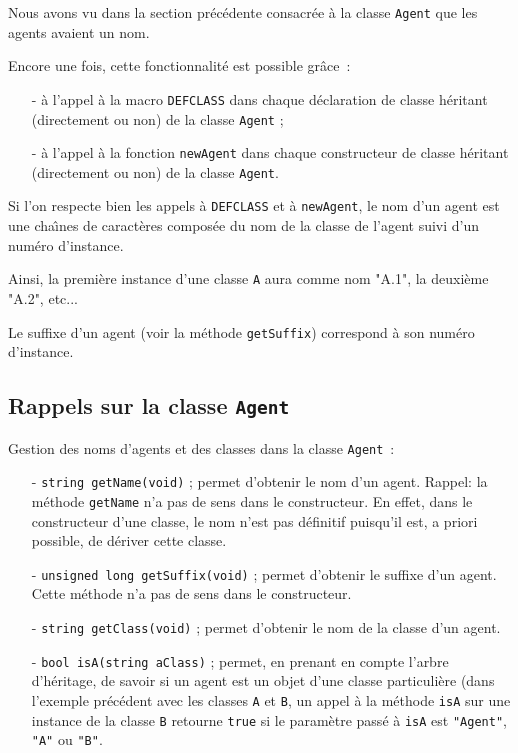 \documentclass[12pt]{article}
\begin{document}
Nous avons vu dans la section pr\'ec\'edente consacr\'ee \`a la
classe {\tt Agent} que les agents avaient un nom.

Encore une fois, cette fonctionnalit\'e est possible gr\^ace~:
\begin{itemize}
\item[-] \`a l'appel \`a la macro {\tt DEFCLASS} dans chaque d\'eclaration
de classe h\'eritant (directement ou non) de la classe {\tt Agent} ;
\item[-] \`a l'appel \`a la fonction {\tt newAgent} dans chaque
constructeur de classe h\'eritant (directement ou non) de la classe
{\tt Agent}.
\end{itemize}

Si l'on respecte bien les appels \`a {\tt DEFCLASS} et \`a {\tt newAgent},
le nom d'un agent est une cha\^ \i nes de caract\`eres compos\'ee
du nom de la classe de l'agent suivi d'un num\'ero d'instance.

Ainsi, la premi\`ere instance d'une classe {\tt A} aura comme nom "A.1",
la deuxi\`eme "A.2", etc...

Le suffixe d'un agent (voir la m\'ethode {\tt getSuffix})
correspond \`a son num\'ero d'instance.

\subsection{Rappels sur la classe {\tt Agent}}

Gestion des noms d'agents et des classes dans la classe {\tt Agent}~:

\begin{itemize}
\vspace{-0.2cm}
\item[-] {\tt string getName(void)} ; permet d'obtenir le nom d'un agent.
Rappel: la m\'ethode {\tt getName} n'a pas de sens dans le constructeur. 
En effet, dans le constructeur d'une classe, le nom n'est pas d\'efinitif
puisqu'il est, a priori possible, de d\'eriver cette classe.
\item[-] {\tt unsigned long getSuffix(void)} ; permet d'obtenir le suffixe
d'un agent.
Cette m\'ethode n'a pas de sens dans le constructeur.
\item[-] {\tt string getClass(void)} ; permet d'obtenir le nom de la
classe d'un agent.
\item[-] {\tt bool isA(string aClass)} ; permet, en prenant en compte
l'arbre d'h\'eritage, de savoir si un agent est un objet d'une classe
particuli\`ere
(dans l'exemple pr\'ec\'edent avec les classes {\tt A} et {\tt B},
un appel \`a la m\'ethode {\tt isA} sur une instance de la
classe {\tt B} retourne {\tt true} si le param\`etre
pass\'e \`a {\tt isA} est {\tt "Agent"}, {\tt "A"} ou {\tt "B"}.
\end{itemize}
\end{document}
